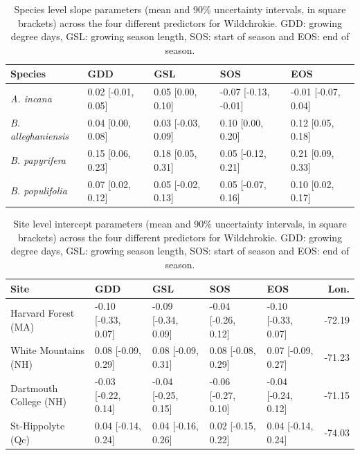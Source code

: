 \documentclass{article}\usepackage[]{graphicx}\usepackage[]{xcolor}
\begin{document}
\begin{table}[ht]
\centering
\caption{Species level slope parameters (mean and 90\% uncertainty intervals, in square brackets) across the four different predictors for Wildchrokie. GDD: growing degree days, GSL: growing season length, SOS: start of season and EOS: end of season.} 
\label{tab:wc_slope_table}
\begin{tabular}{lllll}
  \hline
Species & GDD & GSL & SOS & EOS \\ 
  \hline
\textit{A. incana} & 0.02 [-0.01, 0.05] & 0.05 [0.00, 0.10] & -0.07 [-0.13, -0.01] & -0.01 [-0.07, 0.04] \\ 
  \textit{B. alleghaniensis} & 0.04 [0.00, 0.08] & 0.03 [-0.03, 0.09] & 0.10 [0.00, 0.20] & 0.12 [0.05, 0.18] \\ 
  \textit{B. papyrifera} & 0.15 [0.06, 0.23] & 0.18 [0.05, 0.31] & 0.05 [-0.12, 0.21] & 0.21 [0.09, 0.33] \\ 
  \textit{B. populifolia} & 0.07 [0.02, 0.12] & 0.05 [-0.02, 0.13] & 0.05 [-0.07, 0.16] & 0.10 [0.02, 0.17] \\ 
   \hline
\end{tabular}
\end{table}


\begin{table}[ht]
\centering
\caption{Site level intercept parameters (mean and 90\% uncertainty intervals, in square brackets) across the four different predictors for Wildchrokie. GDD: growing degree days, GSL: growing season length, SOS: start of season and EOS: end of season.} 
\label{tab:wc_asite_table}
\begin{tabular}{lllllr}
  \hline
Site & GDD & GSL & SOS & EOS & Lon. \\ 
  \hline
Harvard Forest (MA) & -0.10 [-0.33, 0.07] & -0.09 [-0.34, 0.09] & -0.04 [-0.26, 0.12] & -0.10 [-0.33, 0.07] & -72.19 \\ 
  White Mountains (NH) & 0.08 [-0.09, 0.29] & 0.08 [-0.09, 0.31] & 0.08 [-0.08, 0.29] & 0.07 [-0.09, 0.27] & -71.23 \\ 
  Dartmouth College (NH) & -0.03 [-0.22, 0.14] & -0.04 [-0.25, 0.15] & -0.06 [-0.27, 0.10] & -0.04 [-0.24, 0.12] & -71.15 \\ 
  St-Hippolyte (Qc) & 0.04 [-0.14, 0.24] & 0.04 [-0.16, 0.26] & 0.02 [-0.15, 0.22] & 0.04 [-0.14, 0.24] & -74.03 \\ 
   \hline
\end{tabular}
\end{table}
\end{document}
